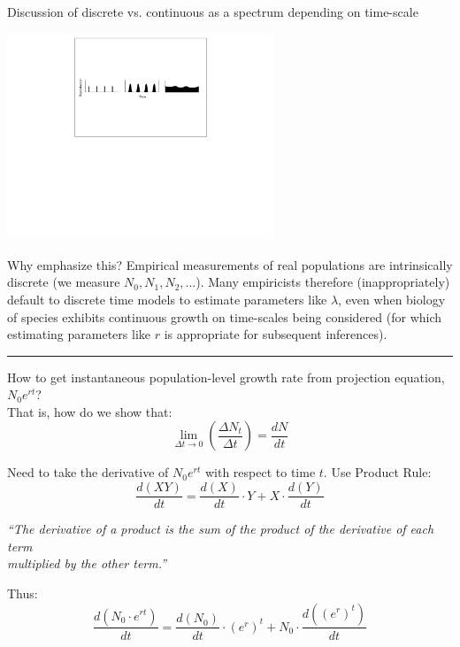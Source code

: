 \documentclass{article}
\newcommand{\note}[1]{\colorbox{gray!20}{#1}}
\newcommand*\circled[1]{\tikz[baseline=(char.base)]{
            \node[shape=circle,draw,inner sep=2pt] (char) {#1};}}
\begin{document}
\note{Discussion of discrete vs. continuous as a spectrum depending on time-scale}

\begin{center}
\includegraphics[width=8cm]{figs/image2}
\end{center}

Why emphasize this?  Empirical measurements of real populations are intrinsically discrete (we measure $N_0, N_1, N_2, ...$). Many empiricists therefore (inappropriately) default to discrete time models to estimate parameters like $\lambda$, even when biology of  species exhibits continuous growth on  time-scales being considered (for which estimating parameters like $r$ is appropriate for subsequent inferences).

\rule[0.5ex]{\linewidth}{1pt}

\circled{3}
How to get instantaneous population-level growth rate from projection equation, $N_0 e^{rt}$?\\
That is, how do we show that:
\begin{equation*}
\lim_{\Delta t \to 0}\left(\frac{\Delta N_t}{\Delta t}\right) = \frac{dN}{dt}
\end{equation*}

Need to take the derivative of $N_0 e^{rt}$ with respect to time $t$.  Use Product Rule:
\begin{equation*}
\frac{d(XY)}{dt}=\frac{d(X)}{dt}\cdot Y + X \cdot \frac{d(Y)}{dt}
\end{equation*}
\begin{center}
\emph{``The derivative of a product is the sum of the product of the derivative of each term\\multiplied by the other term.''}
\end{center}
 Thus:
\begin{equation*}
\frac{d(N_0 \cdot e^{rt})}{dt}=\frac{d(N_0)}{dt}\cdot (e^r)^t + N_0 \cdot \frac{d((e^r)^t)}{dt}
\end{equation*}
\end{document}
